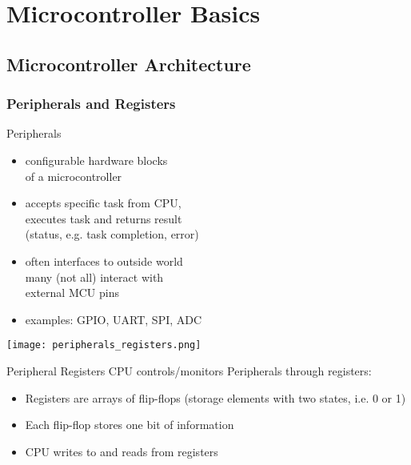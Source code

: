 \section{Microcontroller Basics}

\subsection{Microcontroller Architecture}

\subsubsection{Peripherals and Registers}

\begin{definition}{Peripherals}

    \begin{minipage}{0.35\linewidth}
    \begin{itemize}
        \item configurable hardware blocks \\ of a microcontroller
        \item accepts specific task from CPU, \\ executes task and returns result \\ (status, e.g. task completion, error)
        \item often interfaces to outside world\\
        many (not all) interact with \\ external MCU pins 
        \item examples: GPIO, UART, SPI, ADC
    \end{itemize}
    \end{minipage}
    \begin{minipage}{0.64\linewidth}
        \vspace{-5mm}
        \texttt{[image: peripherals\_registers.png]}
    \end{minipage}
\end{definition}


\begin{concept}{Peripheral Registers}
    CPU controls/monitors Peripherals through registers:
    \begin{itemize}
        \item Registers are arrays of flip-flops (storage elements with two states, i.e. 0 or 1)
        \item Each flip-flop stores one bit of information
        \item CPU writes to and reads from registers
    \end{itemize}
\end{concept}

